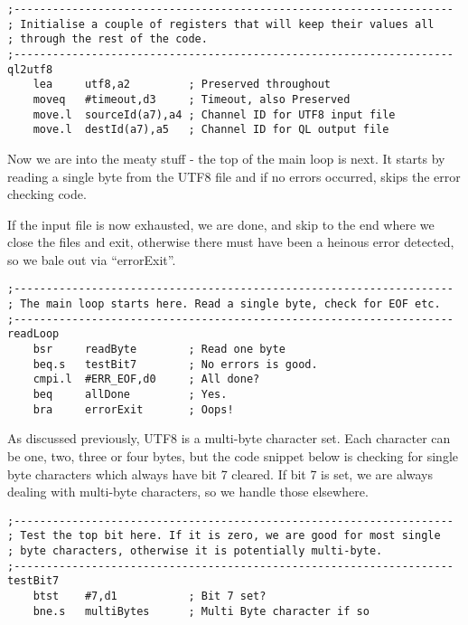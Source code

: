 \begin{lstlisting}[firstnumber=last,caption={Utf82Ql: Initialising constant registers}]
;--------------------------------------------------------------------
; Initialise a couple of registers that will keep their values all
; through the rest of the code.
;--------------------------------------------------------------------
ql2utf8
    lea     utf8,a2         ; Preserved throughout
    moveq   #timeout,d3     ; Timeout, also Preserved
    move.l  sourceId(a7),a4 ; Channel ID for UTF8 input file
    move.l  destId(a7),a5   ; Channel ID for QL output file
\end{lstlisting}

Now we are into the meaty stuff - the top of the main loop is next.
It starts by reading a single byte from the UTF8 file and if no errors
occurred, skips the error checking code.

If the input file is now exhausted, we are done, and skip to the end
where we close the files and exit, otherwise there must have been
a heinous error detected, so we bale out via ``errorExit''.

\begin{lstlisting}[firstnumber=last,caption={Utf82Ql: The main loop starts}]
;--------------------------------------------------------------------
; The main loop starts here. Read a single byte, check for EOF etc.
;--------------------------------------------------------------------
readLoop
    bsr     readByte        ; Read one byte
    beq.s   testBit7        ; No errors is good.
    cmpi.l  #ERR_EOF,d0     ; All done?
    beq     allDone         ; Yes.
    bra     errorExit       ; Oops!
\end{lstlisting}

As discussed previously, UTF8 is a multi-byte character set. Each
character can be one, two, three or four bytes, but the code snippet
below is checking for single byte characters which always have bit
7 cleared. If bit 7 is set, we are always dealing with multi-byte
characters, so we handle those elsewhere.

\begin{lstlisting}[firstnumber=last,caption={Utf82Ql: Testing for one byte UTF characters}]
;--------------------------------------------------------------------
; Test the top bit here. If it is zero, we are good for most single
; byte characters, otherwise it is potentially multi-byte. 
;--------------------------------------------------------------------
testBit7
    btst    #7,d1           ; Bit 7 set?
    bne.s   multiBytes      ; Multi Byte character if so
\end{lstlisting}

